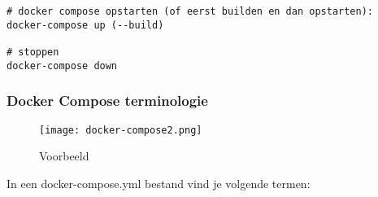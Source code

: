 \documentclass{article}
\begin{document}
\begin{verbatim}
# docker compose opstarten (of eerst builden en dan opstarten):
docker-compose up (--build)

# stoppen
docker-compose down
\end{verbatim}

\subsubsection{Docker Compose terminologie}

\begin{figure}[H]
    \centering
    \texttt{[image: docker-compose2.png]}
    \caption{Voorbeeld}
\end{figure}


In een docker-compose.yml bestand vind je volgende termen:
\end{document}
